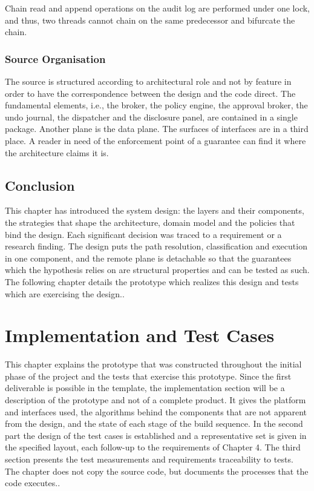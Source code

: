 \documentclass{FastFyp}
\begin{document}
Chain read and append operations on the audit log are performed under one lock, and thus, two threads cannot chain on the same predecessor and bifurcate the chain.

\subsection{Source Organisation}
The source is structured according to architectural role and not by feature in order to have the correspondence between the design and the code direct. The fundamental elements, i.e., the broker, the policy engine, the approval broker, the undo journal, the dispatcher and the disclosure panel, are contained in a single package. Another plane is the data plane. The surfaces of interfaces are in a third place. A reader in need of the enforcement point of a guarantee can find it where the architecture claims it is.


\section{Conclusion}
This chapter has introduced the system design: the layers and their components, the strategies that shape the architecture, domain model and the policies that bind the design. Each significant decision was traced to a requirement or a research finding. The design puts the path resolution, classification and execution in one component, and the remote plane is detachable so that the guarantees which the hypothesis relies on are structural properties and can be tested as such. The following chapter details the prototype which realizes this design and tests which are exercising the design..

\chapter{Implementation and Test Cases}
This chapter explains the prototype that was constructed throughout the initial phase of the project and the tests that exercise this prototype. Since the first deliverable is possible in the template, the implementation section will be a description of the prototype and not of a complete product. It gives the platform and interfaces used, the algorithms behind the components that are not apparent from the design, and the state of each stage of the build sequence. In the second part the design of the test cases is established and a representative set is given in the specified layout, each follow-up to the requirements of Chapter 4. The third section presents the test measurements and requirements traceability to tests. The chapter does not copy the source code, but documents the processes that the code executes..
\end{document}
